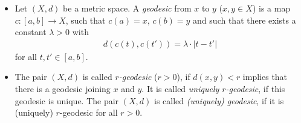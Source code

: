 \begin{defin}[Geodesics]%
  \begin{itemize}
  \item Let \((X, d)\) be a metric space. A \emph{geodesic} from \(x\) to \(y\) (\(x,y \in X\)) is a map \(c\colon [a,b] \to X\), such that \(c(a) = x\), \(c(b) = y\) and such that there exists a constant \(\lambda > 0\) with
    \begin{align*}
      d(c(t), c(t')) = \lambda \cdot |t - t'| 
    \end{align*}
    for all \(t,t' \in [a,b]\).
  \item The pair \((X,d)\) is called \emph{\(r\)-geodesic} (\(r > 0\)), if \(d(x,y) < r\) implies that there is a geodesic joining \(x\) and \(y\). It is called \emph{uniquely \(r\)-geodesic}, if this geodesic is unique. The pair \((X,d)\) is called \emph{(uniquely) geodesic}, if it is (uniquely) \(r\)-geodesic for all \(r > 0\).
  \end{itemize}
\end{defin}

